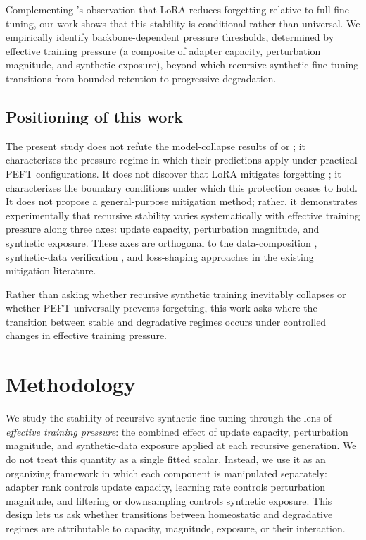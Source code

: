 \documentclass[a4paper,fleqn]{cas-dc}
\begin{document}
Complementing \citet{biderman2024}'s observation that LoRA reduces forgetting
relative to full fine-tuning, our work shows that this stability is conditional
rather than universal. We empirically identify backbone-dependent pressure
thresholds, determined by effective training pressure (a composite of adapter
capacity, perturbation magnitude, and synthetic exposure), beyond which
recursive synthetic fine-tuning transitions from bounded retention to
progressive degradation.

\subsection{Positioning of this work}

The present study does not refute the model-collapse results of
\citet{shumailov2024} or \citet{dohmatob2025}; it characterizes the pressure
regime in which their predictions apply under practical PEFT configurations. It
does not discover that LoRA mitigates forgetting \citep{biderman2024}; it
characterizes the boundary conditions under which this protection ceases to
hold. It does not propose a general-purpose mitigation method; rather, it
demonstrates experimentally that recursive stability varies systematically with
effective training pressure along three axes: update capacity, perturbation
magnitude, and synthetic exposure. These axes are orthogonal to the
data-composition \citep{gerstgrasser2024}, synthetic-data verification
\citep{yi2025}, and loss-shaping \citep{zibakhsh2024} approaches in the
existing mitigation literature.

Rather than asking whether recursive synthetic training inevitably collapses or
whether PEFT universally prevents forgetting, this work asks where the
transition between stable and degradative regimes occurs under controlled
changes in effective training pressure.

\section{Methodology}\label{sec:methodology}

We study the stability of recursive synthetic fine-tuning through the lens of
\textit{effective training pressure}: the combined effect of update capacity,
perturbation magnitude, and synthetic-data exposure applied at each recursive
generation. We do not treat this quantity as a single fitted scalar. Instead, we
use it as an organizing framework in which each component is manipulated
separately: adapter rank controls update capacity, learning rate controls
perturbation magnitude, and filtering or downsampling controls synthetic
exposure. This design lets us ask whether transitions between homeostatic and
degradative regimes are attributable to capacity, magnitude, exposure, or their
interaction.
\end{document}
